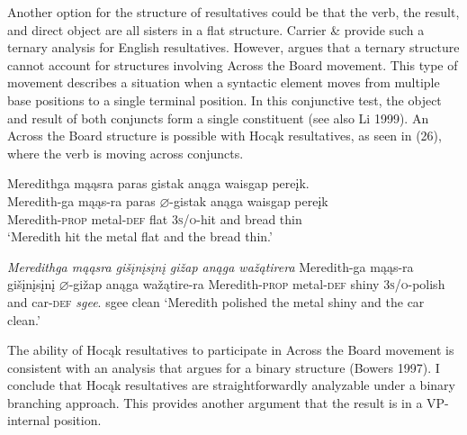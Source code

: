 \documentclass[output=paper]{LSP/langsci}
\begin{document}
Another option for the structure of resultatives could be that the verb, the result, and direct object are all sisters in a flat structure. Carrier \& \citet{Randall1992} provide such a ternary analysis for English resultatives. However, \citet{Bowers1997} argues that a ternary structure cannot account for structures involving Across the Board movement. This type of movement describes a situation when a syntactic element moves from multiple base positions to a single terminal position. In this conjunctive test, the object and result of both conjuncts form a single constituent (see also Li 1999). An Across the Board structure is possible with Hocąk resultatives, as seen in (26), where the verb is moving across conjuncts.

\begin{exe}
\ex
\begin{xlist}

\ex \glll Meredithga mąąsra paras gistak anąga waisgap pereįk. \\
Meredith-ga mąąs-ra paras {$\varnothing$}-gistak anąga waisgap pereįk\\
Meredith-\textsc{prop} metal-\textsc{def} flat \textsc{3s/o}-hit and bread thin\\
\glt `Meredith hit the metal flat and the bread thin.'

\ex \textit{Meredithga \hspace{1.58em} mąąsra \hspace{.9em} gišįnį{s}įnį \hspace{.1em}gižap  \hspace {2.4em} anąga wažątirera}  \newline Meredith-ga \hspace{1.18em} mąąs-ra \hspace {.5em} gišįnį{s}įnį {$\varnothing$}-gižap \hspace{1.3em} anąga wažątire-ra \newline Meredith-\textsc{prop} metal-\textsc{def} shiny \hspace{1.6em} \textsc{3s/o}-polish and \hspace{1em} car-\textsc{def} \newline\textit{sgee}. \newline
sgee \newline
clean \newline
`Meredith polished the metal shiny and the car clean.'

\end{xlist}
\end{exe}
 
The ability of Hocąk resultatives to participate in Across the Board movement is consistent with an analysis that argues for a binary structure (Bowers 1997). I conclude that Hocąk resultatives are straightforwardly analyzable under a binary branching approach. This provides another argument that the result is in a VP-internal position.
 
\end{document}
